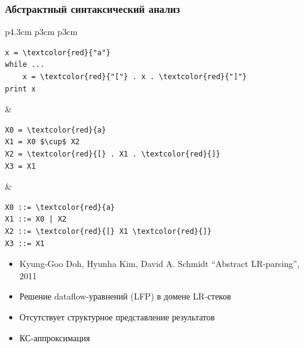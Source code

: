 \documentclass{beamer}
\begin{document}
\begin{frame}[fragile]
	\transwipe[direction=90]
	\frametitle{Абстрактный синтаксический анализ}
	\begin{table}[h]
	\centering
	\begin{tabular}{p{4.3cm} p{3cm} p{3cm}}
		\begin{center}
			\begin{Verbatim}[commandchars=\\\{\}]
x = \textcolor{red}{"a"}
while ...
    x = \textcolor{red}{"["} . x . \textcolor{red}{"]"}
print x
			\end{Verbatim}
		\end{center}
		&
		\begin{center}
			\begin{Verbatim}[commandchars=\\\{\},  
			codes={\catcode`$=3}]
X0 = \textcolor{red}{a} 
X1 = X0 $\cup$ X2
X2 = \textcolor{red}{[} . X1 . \textcolor{red}{]}
X3 = X1 
			\end{Verbatim}
		\end{center}
		&
		\begin{center}
			\begin{Verbatim}[commandchars=\\\{\}]
X0 ::= \textcolor{red}{a}
X1 ::= X0 | X2
X2 ::= \textcolor{red}{[} X1 \textcolor{red}{]} 
X3 ::= X1
			\end{Verbatim}
		\end{center}
	\end{tabular}
	\end{table}
	\begin{itemize}
		\item Kyung-Goo Doh, Hyunha Kim, David A. Schmidt ``Abstract LR-parsing'', 2011
		\item Решение dataflow-уравнений (LFP) в домене LR-стеков 
		\item Отсутствует структурное представление результатов
		\item КС-аппроксимация
	\end{itemize}
\end{frame}
\end{document}
